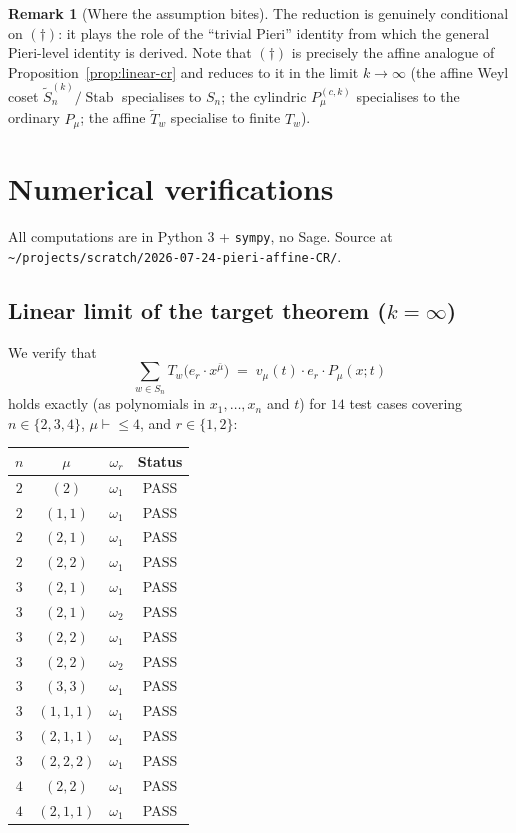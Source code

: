 \documentclass[11pt]{article}
\theoremstyle{definition}
\newtheorem{remark}[theorem]{Remark}
\newcommand{\bmu}{\bar{\mu}}
\newcommand{\wt}[1]{\widetilde{#1}}
\newcommand{\Sn}{S_n}
\newcommand{\afSn}{\wt{S}_n}
\newcommand{\Stab}{\operatorname{Stab}}
\newcommand{\dgg}{\dagger}
\begin{document}
\begin{remark}[Where the assumption bites]
The reduction is genuinely conditional on $(\dgg)$: it plays the role of the
``trivial Pieri'' identity from which the general Pieri-level identity is
derived. Note that $(\dgg)$ is precisely the affine analogue of
Proposition~\ref{prop:linear-cr} and reduces to it in the limit $k \to \infty$
(the affine Weyl coset $\afSn^{(k)}/\Stab$ specialises to $\Sn$; the
cylindric $P^{(c,k)}_\mu$ specialises to the ordinary $P_\mu$; the affine
$\wt T_w$ specialise to finite $T_w$).
\end{remark}

\section{Numerical verifications}
\label{sec:numerics}

All computations are in Python 3 + \texttt{sympy}, no Sage. Source at
\texttt{\textasciitilde/projects/scratch/2026-07-24-pieri-affine-CR/}.

\subsection{Linear limit of the target theorem ($k = \infty$)}
\label{ssec:linear-limit-verif}

We verify that
\[
\sum_{w \in \Sn} T_w\bigl(e_r \cdot x^{\bmu}\bigr) \;=\; v_\mu(t) \cdot e_r \cdot P_\mu(x;t)
\]
holds exactly (as polynomials in $x_1, \ldots, x_n$ and $t$) for $14$ test cases
covering $n \in \{2, 3, 4\}$, $\mu \vdash \le 4$, and $r \in \{1, 2\}$:

\begin{center}
\begin{tabular}{|c|c|c|c|}
\hline
$n$ & $\mu$ & $\omega_r$ & Status \\
\hline
$2$ & $(2)$        & $\omega_1$ & PASS \\
$2$ & $(1,1)$      & $\omega_1$ & PASS \\
$2$ & $(2,1)$      & $\omega_1$ & PASS \\
$2$ & $(2,2)$      & $\omega_1$ & PASS \\
$3$ & $(2,1)$      & $\omega_1$ & PASS \\
$3$ & $(2,1)$      & $\omega_2$ & PASS \\
$3$ & $(2,2)$      & $\omega_1$ & PASS \\
$3$ & $(2,2)$      & $\omega_2$ & PASS \\
$3$ & $(3,3)$      & $\omega_1$ & PASS \\
$3$ & $(1,1,1)$    & $\omega_1$ & PASS \\
$3$ & $(2,1,1)$    & $\omega_1$ & PASS \\
$3$ & $(2,2,2)$    & $\omega_1$ & PASS \\
$4$ & $(2,2)$      & $\omega_1$ & PASS \\
$4$ & $(2,1,1)$    & $\omega_1$ & PASS \\
\hline
\end{tabular}
\end{center}
\end{document}
